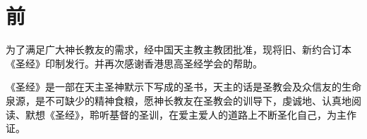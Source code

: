 \chapter*{前}

为了满足广大神长教友的需求，经中国天主教主教团批准，现将旧、新约合订本《圣经》印制发行。并再次感谢香港思高圣经学会的帮助。

《圣经》是一部在天主圣神默示下写成的圣书，天主的话是圣教会及众信友的生命泉源，是不可缺少的精神食粮，愿神长教友在圣教会的训导下，虔诚地、认真地阅读、默想《圣经》，聆听基督的圣训，在爱主爱人的道路上不断圣化自己，为主作证。



